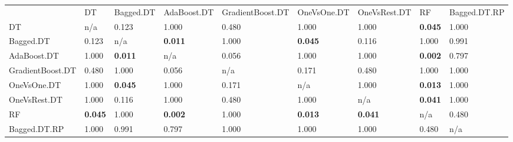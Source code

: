 \begin{tabular}{|lllllllll|}
\hline
 & DT & Bagged.DT & AdaBoost.DT & GradientBoost.DT & OneVsOne.DT & OneVsRest.DT & RF & Bagged.DT.RP \\
DT & n/a & 0.123 & 1.000 & 0.480 & 1.000 & 1.000 & {\bf 0.045} & 1.000 \\
Bagged.DT & 0.123 & n/a & {\bf 0.011} & 1.000 & {\bf 0.045} & 0.116 & 1.000 & 0.991 \\
AdaBoost.DT & 1.000 & {\bf 0.011} & n/a & 0.056 & 1.000 & 1.000 & {\bf 0.002} & 0.797 \\
GradientBoost.DT & 0.480 & 1.000 & 0.056 & n/a & 0.171 & 0.480 & 1.000 & 1.000 \\
OneVsOne.DT & 1.000 & {\bf 0.045} & 1.000 & 0.171 & n/a & 1.000 & {\bf 0.013} & 1.000 \\
OneVsRest.DT & 1.000 & 0.116 & 1.000 & 0.480 & 1.000 & n/a & {\bf 0.041} & 1.000 \\
RF & {\bf 0.045} & 1.000 & {\bf 0.002} & 1.000 & {\bf 0.013} & {\bf 0.041} & n/a & 0.480 \\
Bagged.DT.RP & 1.000 & 0.991 & 0.797 & 1.000 & 1.000 & 1.000 & 0.480 & n/a \\
\hline
\end{tabular}
